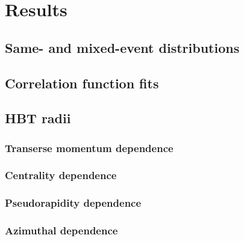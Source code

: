 \chapter{Results}
\label{ch:results}

\section{Same- and mixed-event distributions}
\section{Correlation function fits}
\section{HBT radii}
\subsection{Transerse momentum dependence}
\subsection{Centrality dependence}
\subsection{Pseudorapidity dependence}
\subsection{Azimuthal dependence}

